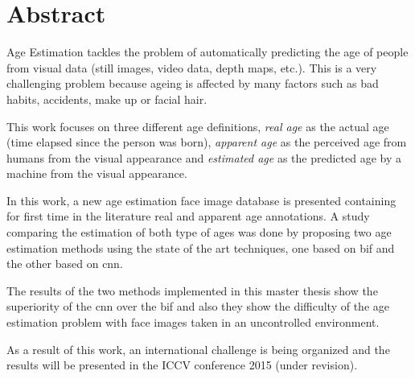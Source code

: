 \chapter*{Abstract}

Age Estimation tackles the problem of automatically predicting the age of people from visual data (still images, video data, depth maps, etc.). 
This is a very challenging problem because ageing is affected by many factors \cite{shephard1997aging} such as bad habits, accidents, make up or facial hair.

This work focuses on three different age definitions, \textit{real age} as the actual age (time elapsed since the person was born), \textit{apparent age} as the perceived age from humans from the visual appearance and \textit{estimated age} as the predicted age by a machine from the visual appearance.

In this work, a new age estimation face image database is presented containing for first time in the literature real and apparent age annotations. A study comparing the estimation of both type of ages was done by proposing two age estimation methods using the state of the art techniques, one based on \acrfull{bif} and the other based on \acrfull{cnn}.

The results of the two methods implemented in this master thesis show the superiority of the \acrshort{cnn} over the \acrshort{bif} and also they show the difficulty of the age estimation problem with face images taken in an uncontrolled environment.

As a result of this work, an international challenge is being organized and the results will be presented in the ICCV conference 2015 (under revision).
